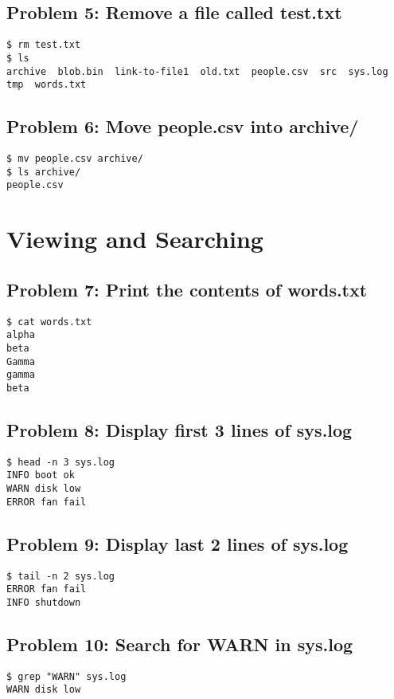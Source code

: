 \subsection*{Problem 5: Remove a file called test.txt}
\begin{verbatim}
$ rm test.txt
$ ls
archive  blob.bin  link-to-file1  old.txt  people.csv  src  sys.log  tmp  words.txt
\end{verbatim}

\subsection*{Problem 6: Move people.csv into archive/}
\begin{verbatim}
$ mv people.csv archive/
$ ls archive/
people.csv
\end{verbatim}

\section{Viewing and Searching}

\subsection*{Problem 7: Print the contents of words.txt}
\begin{verbatim}
$ cat words.txt
alpha
beta
Gamma
gamma
beta
\end{verbatim}

\subsection*{Problem 8: Display first 3 lines of sys.log}
\begin{verbatim}
$ head -n 3 sys.log
INFO boot ok
WARN disk low
ERROR fan fail
\end{verbatim}

\subsection*{Problem 9: Display last 2 lines of sys.log}
\begin{verbatim}
$ tail -n 2 sys.log
ERROR fan fail
INFO shutdown
\end{verbatim}

\subsection*{Problem 10: Search for WARN in sys.log}
\begin{verbatim}
$ grep "WARN" sys.log
WARN disk low
\end{verbatim}

